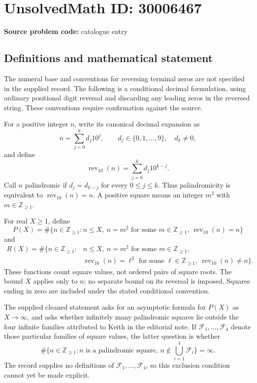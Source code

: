 \documentclass[11pt]{article}
\newcommand{\Z}{\mathbb{Z}}
\begin{document}
\section*{UnsolvedMath ID: 30006467}
\textbf{Source problem code:} catalogue entry
\subsection{Definitions and mathematical statement}
The numeral base and conventions for reversing terminal zeros are not specified in the supplied record. The following is a conditional decimal formulation, using ordinary positional digit reversal and discarding any leading zeros in the reversed string. These conventions require confirmation against the source.

For a positive integer \(n\), write its canonical decimal expansion as
\[
n=\sum_{j=0}^{k}d_j10^j,\qquad d_j\in\{0,1,\ldots,9\},\quad d_k\ne0,
\]
and define
\[
\operatorname{rev}_{10}(n)=\sum_{j=0}^{k}d_j10^{k-j}.
\]
Call \(n\) palindromic if \(d_j=d_{k-j}\) for every \(0\le j\le k\). Thus palindromicity is equivalent to \(\operatorname{rev}_{10}(n)=n\). A positive square means an integer \(m^2\) with \(m\in\Z_{\ge1}\).

For real \(X\ge1\), define
\[
P(X)=\#\{n\in\Z_{\ge1}:n\le X,\ n=m^2\text{ for some }m\in\Z_{\ge1},\ \operatorname{rev}_{10}(n)=n\}
\]
and
\[
\begin{split}
R(X)=\#\{n\in\Z_{\ge1}:{}&n\le X,\ n=m^2\text{ for some }m\in\Z_{\ge1},\\
&\operatorname{rev}_{10}(n)=\ell^2\text{ for some }\ell\in\Z_{\ge1},\ \operatorname{rev}_{10}(n)\ne n\}.
\end{split}
\]
These functions count square values, not ordered pairs of square roots. The bound \(X\) applies only to \(n\); no separate bound on its reversal is imposed. Squares ending in zero are included under the stated conditional convention.

The supplied cleaned statement asks for an asymptotic formula for \(P(X)\) as \(X\to\infty\), and asks whether infinitely many palindromic squares lie outside the four infinite families attributed to Keith in the editorial note. If \(\mathcal F_1,\ldots,\mathcal F_4\) denote those particular families of square values, the latter question is whether
\[
\#\bigl\{n\in\Z_{\ge1}:n\text{ is a palindromic square},\ n\notin\textstyle\bigcup_{i=1}^{4}\mathcal F_i\bigr\}=\infty.
\]
The record supplies no definitions of \(\mathcal F_1,\ldots,\mathcal F_4\), so this exclusion condition cannot yet be made explicit.
\end{document}
